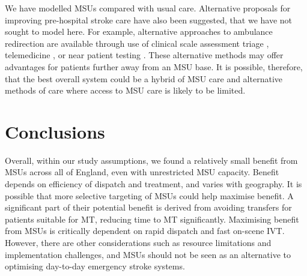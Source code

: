 We have modelled MSUs compared with usual care. Alternative proposals for improving pre-hospital stroke care have also been suggested, that we have not sought to model here. For example, alternative approaches to ambulance redirection are available through use of clinical scale assessment triage \cite{dekker_prehospital_2025}, telemedicine \cite{sarpourian_application_2023}, or near patient testing \cite{shaw_rapid_2024}. These alternative methods may offer advantages for patients further away from an MSU base. It is possible, therefore, that the best overall system could be a hybrid of MSU care and alternative methods of care where access to MSU care is likely to be limited.

\section{Conclusions}

Overall, within our study assumptions, we found a relatively small benefit from MSUs across all of England, even with unrestricted MSU capacity. Benefit depends on efficiency of dispatch and treatment, and varies with geography. It is possible that more selective targeting of MSUs could help maximise benefit. A significant part of their potential benefit is derived from avoiding transfers for patients suitable for MT, reducing time to MT significantly. Maximising benefit from MSUs is critically dependent on rapid dispatch and fast on-scene IVT. However, there are other considerations such as resource limitations and implementation challenges, and MSUs should not be seen as an alternative to optimising day-to-day emergency stroke systems.
